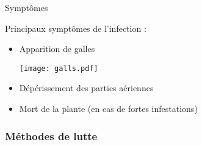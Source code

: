 \begin{frame}{Symptômes}

   
{\normalsize Principaux symptômes de l'infection : }

    {\small        \begin{itemize}[itemsep=10pt]

 
 \item Apparition de galles
     \begin{center}
      
 \texttt{[image: galls.pdf]}  

  \end{center}

\item<2> Dépérissement des parties aériennes
\item<2> Mort de  la plante (en cas de fortes infestations)  
  \hspace{-5mm}
  \begin{center}

  \end{center}
 
   \end{itemize}}


\end{frame}


\subsubsection{Méthodes de lutte}


